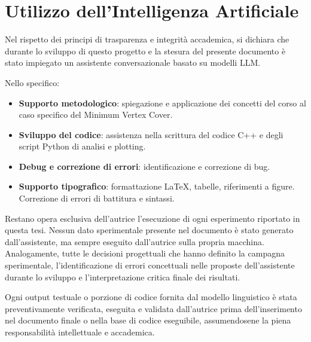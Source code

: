 \chapter*{Utilizzo dell'Intelligenza Artificiale}

Nel rispetto dei principi di trasparenza e integrità accademica,
si dichiara che durante lo sviluppo di questo progetto e la stesura del presente documento è stato impiegato un assistente conversazionale basato su modelli LLM.

Nello specifico:

\begin{itemize}
    \item \textbf{Supporto metodologico}: spiegazione e applicazione dei concetti del corso al caso specifico del Minimum Vertex Cover.
    \item \textbf{Sviluppo del codice}: assistenza nella scrittura del codice C++ e degli script Python di analisi e plotting. 
    \item \textbf{Debug e correzione di errori}: identificazione e correzione di bug. 
    \item \textbf{Supporto tipografico}: formattazione LaTeX, tabelle, riferimenti a figure. Correzione di errori di battitura e sintassi.
\end{itemize}

Restano opera esclusiva dell'autrice l'esecuzione di ogni esperimento riportato in questa tesi. 
Nessun dato sperimentale presente nel documento è stato generato dall'assistente, ma sempre eseguito dall'autrice sulla propria macchina. 
Analogamente, tutte le decisioni progettuali che hanno definito la campagna sperimentale, l'identificazione di errori concettuali nelle proposte dell'assistente durante lo sviluppo e l'interpretazione critica finale dei risultati.

Ogni output testuale o porzione di codice fornita dal modello linguistico è stata preventivamente verificata, 
eseguita e validata dall'autrice prima dell'inserimento nel documento finale o nella base di codice eseguibile, 
assumendosene la piena responsabilità intellettuale e accademica.